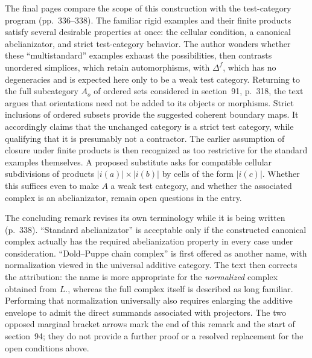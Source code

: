 The final pages compare the scope of this construction with the test-category program (pp.~336--338). The familiar rigid examples and their finite products satisfy several desirable properties at once: the cellular condition, a canonical abelianizator, and strict test-category behavior. The author wonders whether these ``multistandard'' examples exhaust the possibilities, then contrasts unordered simplices, which retain automorphisms, with $\Delta^f$, which has no degeneracies and is expected here only to be a weak test category. Returning to the full subcategory $A_o$ of ordered sets considered in section~91, p.~318, the text argues that orientations need not be added to its objects or morphisms. Strict inclusions of ordered subsets provide the suggested coherent boundary maps. It accordingly claims that the unchanged category is a strict test category, while qualifying that it is presumably not a contractor. The earlier assumption of closure under finite products is then recognized as too restrictive for the standard examples themselves. A proposed substitute asks for compatible cellular subdivisions of products $|i(a)|\times|i(b)|$ by cells of the form $|i(c)|$. Whether this suffices even to make $A$ a weak test category, and whether the associated complex is an abelianizator, remain open questions in the entry.

The concluding remark revises its own terminology while it is being written (p.~338). ``Standard abelianizator'' is acceptable only if the constructed canonical complex actually has the required abelianization property in every case under consideration. ``Dold--Puppe chain complex'' is first offered as another name, with normalization viewed in the universal additive category. The text then corrects the attribution: the name is more appropriate for the \emph{normalized} complex obtained from $L.$, whereas the full complex itself is described as long familiar. Performing that normalization universally also requires enlarging the additive envelope to admit the direct summands associated with projectors. The two opposed marginal bracket arrows mark the end of this remark and the start of section~94; they do not provide a further proof or a resolved replacement for the open conditions above.


